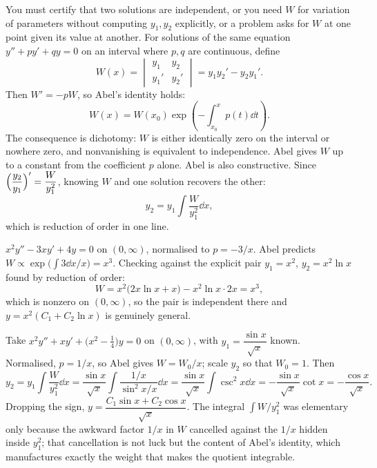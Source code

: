 \cue You must certify that two solutions are independent, or you need $W$ for variation of parameters without computing $y_1,y_2$ explicitly, or a problem asks for $W$ at one point given its value at another.
\method For solutions of the same equation $y''+py'+qy=0$ on an interval where $p,q$ are continuous, define
\[W(x)=\begin{vmatrix}y_1&y_2\\y_1'&y_2'\end{vmatrix}=y_1y_2'-y_2y_1'.\]
Then $W'=-pW$, so Abel's identity holds:
\[W(x)=W(x_0)\exp\!\left(-\int_{x_0}^{x}p(t)\dd t\right).\]
The consequence is dichotomy: $W$ is either identically zero on the interval or nowhere zero, and nonvanishing is equivalent to independence. Abel gives $W$ up to a constant from the coefficient $p$ alone.
Abel is also constructive. Since $\Bigl(\dfrac{y_2}{y_1}\Bigr)'=\dfrac{W}{y_1^{2}}$, knowing $W$ and one solution recovers the other:
\[y_2=y_1\int\frac{W}{y_1^{2}}\dd x,\]
which is reduction of order in one line.

\begin{worked}
$x^{2}y''-3xy'+4y=0$ on $(0,\infty)$, normalised to $p=-3/x$. Abel predicts $W\propto\exp\bigl(\int3\dd x/x\bigr)=x^{3}$. Checking against the explicit pair $y_1=x^{2}$, $y_2=x^{2}\ln x$ found by reduction of order:
\[W=x^{2}\bigl(2x\ln x+x\bigr)-x^{2}\ln x\cdot2x=x^{3},\]
which is nonzero on $(0,\infty)$, so the pair is independent there and $y=x^{2}(C_1+C_2\ln x)$ is genuinely general.
\end{worked}

\begin{worked}
Take $x^{2}y''+xy'+\bigl(x^{2}-\tfrac14\bigr)y=0$ on $(0,\infty)$, with $y_1=\dfrac{\sin x}{\sqrt x}$ known. Normalised, $p=1/x$, so Abel gives $W=W_0/x$; scale $y_2$ so that $W_0=1$. Then
\[y_2=y_1\int\frac{W}{y_1^{2}}\dd x=\frac{\sin x}{\sqrt x}\int\frac{1/x}{\sin^{2}x/x}\dd x=\frac{\sin x}{\sqrt x}\int\csc^{2}x\dd x=-\frac{\sin x}{\sqrt x}\cot x=-\frac{\cos x}{\sqrt x}.\]
Dropping the sign, $y=\dfrac{C_1\sin x+C_2\cos x}{\sqrt x}$. The integral $\int W/y_1^{2}$ was elementary only because the awkward factor $1/x$ in $W$ cancelled against the $1/x$ hidden inside $y_1^{2}$; that cancellation is not luck but the content of Abel's identity, which manufactures exactly the weight that makes the quotient integrable.
\end{worked}

